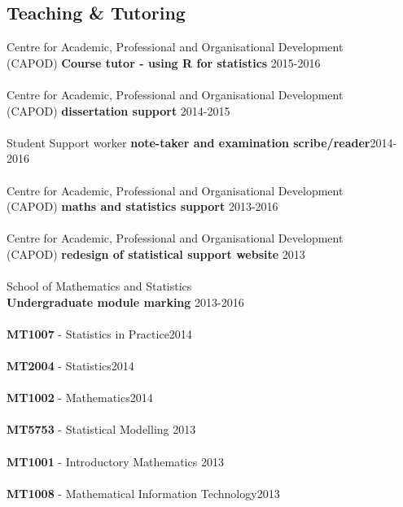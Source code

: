 \documentclass[10pt,letter]{res}
\begin{document}
\begin{resume}
 
 \vspace{-2mm}
 \section{Teaching \& Tutoring}
 \vspace{1mm}
 
 Centre for Academic, Professional and Organisational Development\\ (CAPOD) \textbf{Course tutor - using R for statistics} \hfill{2015-2016}\\
 \hdashrule[0.5ex]{4cm}{1pt}{1pt}\\
 Centre for Academic, Professional and Organisational Development\\ (CAPOD) \textbf{dissertation support} \hfill{2014-2015}\\
 \hdashrule[0.5ex]{4cm}{1pt}{1pt}\\
Student Support worker \textbf{note-taker and examination scribe/reader}\hfill {2014-2016}\\
 \hdashrule[0.5ex]{4cm}{1pt}{1pt}\\
  Centre for Academic, Professional and Organisational Development\\ (CAPOD) \textbf{maths and statistics support} \hfill{2013-2016}\\
 \hdashrule[0.5ex]{4cm}{1pt}{1pt}\\
 Centre for Academic, Professional and Organisational Development\\ (CAPOD) \textbf{redesign of statistical support website} \hfill{2013}\\
 \hdashrule[0.5ex]{4cm}{1pt}{1pt}\\
School of Mathematics and Statistics\\ \textbf{Undergraduate module marking} \hfill{2013-2016}\\
 \hdashrule[0.5ex]{4cm}{1pt}{1pt}\\
\textbf{MT1007} -  Statistics in Practice\hfill{2014}\\
 \hdashrule[0.5ex]{4cm}{1pt}{1pt}\\
  \textbf{MT2004} -  Statistics\hfill{2014}\\
 \hdashrule[0.5ex]{4cm}{1pt}{1pt}\\
  \textbf{MT1002} -  Mathematics\hfill{2014}\\
 \hdashrule[0.5ex]{4cm}{1pt}{1pt}\\
 \textbf{MT5753} -  Statistical Modelling \hfill{2013}\\
 \hdashrule[0.5ex]{4cm}{1pt}{1pt}\\
\textbf{MT1001} -  Introductory Mathematics \hfill{2013}\\
 \hdashrule[0.5ex]{4cm}{1pt}{1pt}\\
  \textbf{MT1008} -  Mathematical Information Technology\hfill{2013}\\
  
\end{resume}
\end{document}
